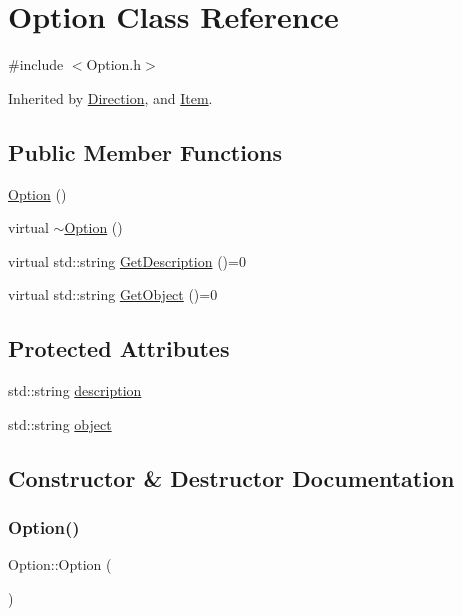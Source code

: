 \hypertarget{class_option}{}\section{Option Class Reference}
\label{class_option}


{\ttfamily \#include $<$Option.\+h$>$}



Inherited by \mbox{\hyperlink{class_direction}{Direction}}, and \mbox{\hyperlink{class_item}{Item}}.

\subsection*{Public Member Functions}
\begin{DoxyCompactItemize}
\item 
\mbox{\hyperlink{class_option_af517613005312013c576eb9099a50464}{Option}} ()
\item 
virtual \mbox{\hyperlink{class_option_a51319077627d44640d65010abc14b3c9}{$\sim$\+Option}} ()
\item 
virtual std\+::string \mbox{\hyperlink{class_option_a5e931f580c01238769c5de228666d0a5}{Get\+Description}} ()=0
\item 
virtual std\+::string \mbox{\hyperlink{class_option_ae87cbc4730a9b60734babe6b253fac0b}{Get\+Object}} ()=0
\end{DoxyCompactItemize}
\subsection*{Protected Attributes}
\begin{DoxyCompactItemize}
\item 
std\+::string \mbox{\hyperlink{class_option_a254f3009a726b0d5e6200b1daa4b163c}{description}}
\item 
std\+::string \mbox{\hyperlink{class_option_a20f3dafc9968fd4868a7ea1d8c40a6b2}{object}}
\end{DoxyCompactItemize}


\subsection{Constructor \& Destructor Documentation}
\mbox{\label{class_option_af517613005312013c576eb9099a50464}} 
\subsubsection{\texorpdfstring{Option()}{Option()}}
{\footnotesize\ttfamily Option\+::\+Option (\begin{DoxyParamCaption}{ }\end{DoxyParamCaption})\hspace{0.3cm}{\ttfamily [inline]}}

